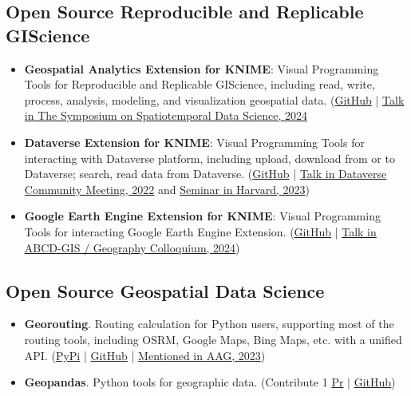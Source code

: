 \documentclass[11pt]{article}
\begin{document}
\subsection*{\textbf{Open Source Reproducible and Replicable GIScience}}
\begin{itemize}
	\item[] \textbf{Geospatial Analytics Extension for KNIME}: Visual Programming Tools for Reproducible and Replicable GIScience, including read, write, process, analysis, modeling, and visualization geospatial data. (\href{https://github.com/spatial-data-lab/knime-geospatial-extension}{GitHub} | \href{https://sdl.gis.harvard.edu/sites/projects.iq.harvard.edu/files/agenda_2024_3_1.pdf}{Talk in The Symposium on Spatiotemporal Data Science, 2024}

	\item[] \textbf{Dataverse Extension for KNIME}: Visual Programming Tools for interacting with Dataverse platform, including upload, download from or to Dataverse; search, read data from Dataverse. (\href{https://github.com/spatial-data-lab/knime-dataverse-extension}{GitHub} | \href{https://projects.iq.harvard.edu/dcm2022/agenda}{Talk in Dataverse Community Meeting, 2022} and \href{https://gis.harvard.edu/event/integrating-cloud-computing-knime-platform-monitoring-deforestation}{Seminar in Harvard, 2023})

	\item[] \textbf{Google Earth Engine Extension for KNIME}: Visual Programming Tools for interacting Google Earth Engine Extension. (\href{https://github.com/spatial-data-lab/knime-gee-extension}{GitHub} | \href{https://gis.harvard.edu/event/integrating-cloud-computing-knime-platform-monitoring-deforestation}{Talk in ABCD-GIS / Geography Colloquium, 2024})
\end{itemize}

\subsection*{Open Source Geospatial Data Science}

\begin{itemize}
	\item[] \textbf{Georouting}. Routing calculation for Python users, supporting most of the routing tools, including OSRM, Google Maps, Bing Maps, etc. with a unified API. (\href{https://pypi.org/project/georouting/}{PyPi} | \href{https://github.com/wybert/georouting}{GitHub} | \href{https://www.aag.org/wp-content/uploads/2023/03/AAG-2023-PDF-program.pdf}{Mentioned in AAG, 2023})

	\item[] \textbf{Geopandas}. Python tools for geographic data. (Contribute 1  \href{https://github.com/geopandas/geopandas/pull/2658}{Pr} | \href{https://github.com/geopandas/geopandas}{GitHub})
\end{itemize}
\end{document}
